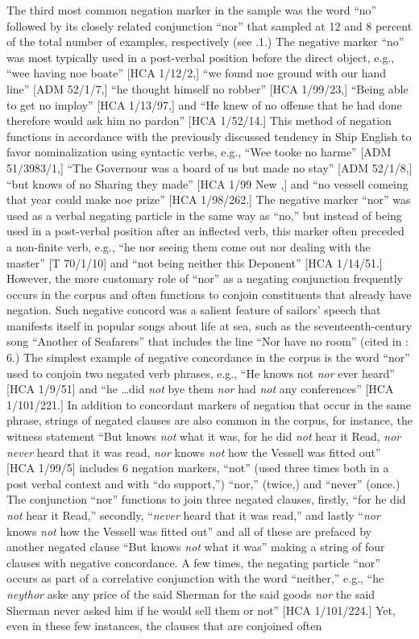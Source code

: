 The third most common negation marker in the sample was the word “no” followed by its closely related conjunction “nor” that sampled at 12 and 8 percent of the total number of examples, respectively (see .1.) The negative marker “no” was most typically used in a post-verbal position before the direct object, e.g., “wee having noe boate” [HCA 1/12/2,] “we found noe ground with our hand line” [ADM 52/1/7,] “he thought himself no robber” [HCA 1/99/23,] “Being able to get no imploy” [HCA 1/13/97,] and “He knew of no offense that he had done therefore would ask him no pardon” [HCA 1/52/14.] This method of negation functions in accordance with the previously discussed tendency in Ship English to favor nominalization using syntactic verbs, e.g., “Wee tooke no harme” [ADM 51/3983/1,] “The Governour was a board of us but made no stay” [ADM 52/1/8,] “but knows of no Sharing they made” [HCA 1/99 New \citealt{Providence1722},] and “no vessell comeing that year could make noe prize” [HCA 1/98/262.] The negative marker “nor” was used as a verbal negating particle in the same way as “no,” but instead of being used in a post-verbal position after an inflected verb, this marker often preceded a non-finite verb, e.g., “he nor seeing them come out nor dealing with the master” [T 70/1/10] and “not being neither this Deponent” [HCA 1/14/51.] However, the more customary role of “nor” as a negating conjunction frequently occurs in the corpus and often functions to conjoin constituents that already have negation. Such negative concord was a salient feature of sailors’ speech that manifests itself in popular songs about life at sea, such as the seventeenth-century song “Another of Seafarers” that includes the line “Nor have no room” (cited in \citealt{Palmer1986}: 6.) The simplest example of negative concordance in the corpus is the word “nor” used to conjoin two negated verb phrases, e.g., “He knows not \textit{nor} ever heard” [HCA 1/9/51] and “he …did \textit{not} bye them \textit{nor} had \textit{not} any conferences” [HCA 1/101/221.] In addition to concordant markers of negation that occur in the same phrase, strings of negated clauses are also common in the corpus, for instance, the witness statement “But knows \textit{not} what it was, for he did \textit{not} hear it Read, \textit{nor} \textit{never} heard that it was read, \textit{nor} knows \textit{not} how the Vessell was fitted out” [HCA 1/99/5] includes 6 negation markers, “not” (used three times both in a post verbal context and with “do support,”) “nor,” (twice,) and “never” (once.) The conjunction “nor” functions to join three negated clauses, firstly, “for he did \textit{not} hear it Read,” secondly, “\textit{never} heard that it was read,” and lastly “\textit{nor} knows \textit{not} how the Vessell was fitted out” and all of these are prefaced by another negated clause “But knows \textit{not} what it was” making a string of four clauses with negative concordance. A few times, the negating particle “nor” occurs as part of a correlative conjunction with the word “neither,” e.g., “he \textit{neythor} aske any price of the said Sherman for the said goods \textit{nor} the said Sherman never asked him if he would sell them or not” [HCA 1/101/224.] Yet, even in these few instances, the clauses that are conjoined often 
